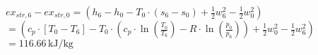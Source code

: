 \( ex_{str,6} - ex_{str,0} = (h_6 - h_0 - T_0 \cdot (s_6 - s_0) + \frac{1}{2} w_6^2 - \frac{1}{2} w_0^2) \)  
\( = (c_p \cdot [T_0 - T_6] - T_0 \cdot (c_p \cdot \ln \left( \frac{T_0}{T_6} \right) - R \cdot \ln \left( \frac{p_0}{p_6} \right)) + \frac{1}{2} w_0^2 - \frac{1}{2} w_6^2) \)  
\( = 116.66 \, \text{kJ/kg} \)